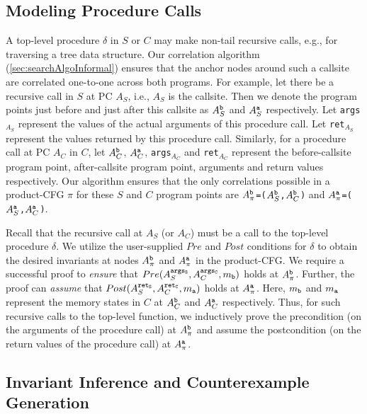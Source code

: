 \subsection{Modeling Procedure Calls}
\label{sec:modelfcalls}
A top-level procedure $\delta$
in $S$ or $C$ may make non-tail recursive
calls, e.g., for traversing
a tree data structure.
Our correlation algorithm (\cref{sec:searchAlgoInformal}) ensures
that the anchor nodes around such a callsite are correlated
one-to-one across both programs. For example, let there be a
recursive call in $S$ at PC $A_S$, i.e., $A_S$ is the callsite.
Then we denote the program points just before and just
after this callsite
as $A^{{\tt b}}_S$ and $A^{{\tt a}}_S$ respectively.
Let {\tt args$_{A_S}$}
represent the values of the
actual arguments of this procedure call.
Let {\tt ret$_{A_S}$} represent the values returned by this procedure call.
Similarly, for a procedure call at PC $A_C$ in $C$, let
$A^{{\tt b}}_C$,
$A^{{\tt a}}_C$,
{\tt args$_{A_C}$} and {\tt ret$_{A_C}$} 
represent the before-callsite program point, after-callsite program point,
arguments and return values respectively.
Our algorithm ensures that the only correlations possible in
a product-CFG $\pi$ for these $S$ and $C$ program points are
{\tt $A_{\pi}^{{\tt b}}$=($A_{S}^{{\tt b}}$,$A_{C}^{{\tt b}}$)}
and
{\tt $A_{\pi}^{{\tt a}}$=($A_{S}^{{\tt a}}$,$A_{C}^{{\tt a}}$)}.

Recall that the recursive call at $A_S$ (or $A_C$) must
be a call to the top-level procedure $\delta$.
We utilize the user-supplied $Pre$ and $Post$ conditions for $\delta$ to obtain
the desired invariants at nodes $A_{\pi}^{{\tt b}}$
and 
$A_{\pi}^{{\tt a}}$ in the product-CFG.
We require a successful proof to
{\em ensure} that {\small $Pre(A^{{\tt args_S}}_S, A^{{\tt args_C}}_C, m_{\tt b})$}
holds at $A_{\pi}^{{\tt b}}$.  Further, the proof can
{\em assume} that {\small $Post(A^{{\tt ret_S}}_S, A^{{\tt ret_C}}_C, m_{\tt a})$} holds
at 
$A_{\pi}^{{\tt a}}$. Here, $m_{\tt b}$
and $m_{\tt a}$ represent the memory states in $C$ at
$A^{{\tt b}}_C$ and
$A^{{\tt a}}_C$ respectively.
Thus, for such recursive calls to the
top-level function, we inductively
prove the precondition (on the
arguments of the procedure call) at $A_{\pi}^{{\tt b}}$
and assume the postcondition (on the return values of the procedure call)
at $A_{\pi}^{{\tt a}}$.



\subsection{Invariant Inference and Counterexample Generation}
\label{sec:invinference}

